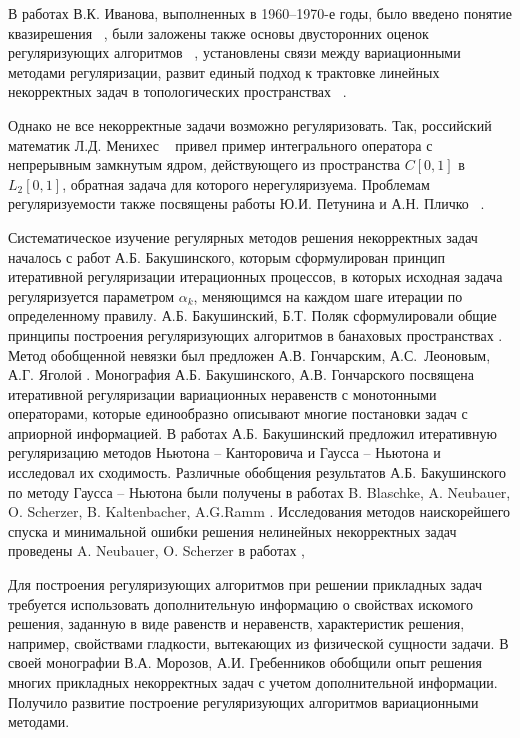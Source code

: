 {В работах В.К. Иванова, выполненных в 1960--1970-е годы, было введено понятие квазирешения ~\cite{Iv1962_2, Iv1963}, были заложены также основы двусторонних оценок регуляризующих алгоритмов ~\cite{Iv1966}, установлены связи между вариационными методами регуляризации, развит единый подход к трактовке линейных некорректных задач в топологических пространствах ~\cite{Iv1967}. 

Однако не все некорректные задачи возможно регуляризовать. Так, российский математик Л.Д. Менихес ~\cite{Menih1978} привел пример интегрального оператора с непрерывным замкнутым ядром, действующего из пространства \( C[0,1] \) в \( L_2[0,1] \), обратная задача для которого нерегуляризуема. Проблемам регуляризуемости также посвящены работы Ю.И. Петунина и А.Н. Пличко ~\cite{PetPlich1980}.

Систематическое изучение регулярных методов решения некорректных задач началось с работ А.Б. Бакушинского, которым сформулирован принцип итеративной регуляризации итерационных процессов, в которых исходная задача регуляризуется параметром $\alpha_k$, меняющимся на каждом шаге итерации по определенному правилу. А.Б. Бакушинский, Б.Т. Поляк сформулировали общие принципы построения регуляризующих алгоритмов в банаховых пространствах \cite{BakPol1974}. Метод обобщенной невязки был предложен А.В. Гончарским, А.С.~Леоновым, А.Г. Яголой \cite{GonLeoYag1973}. Монография А.Б. Бакушинского, А.В. Гончарского \cite{BakGon1989} посвящена итеративной регуляризации вариационных неравенств с монотонными операторами, которые единообразно описывают многие постановки задач с априорной информацией. В работах \cite{Bak1976,Bak1992} А.Б. Бакушинский предложил итеративную регуляризацию методов Ньютона -- Канторовича и Гаусса -- Ньютона и исследовал их сходимость. Различные обобщения результатов А.Б. Бакушинского по методу Гаусса -- Ньютона были получены в работах B. Blaschke, A. Neubauer, O. Scherzer, B. Kaltenbacher, A.G.Ramm \cite{BlaNeuSch1997,KalNeuRam2002}. Исследования методов наискорейшего спуска и минимальной ошибки решения нелинейных некорректных задач проведены A. Neubauer, O. Scherzer в работах  \cite{NeuSch1995_1,NeuSch1995_2,Sch1995},

Для построения регуляризующих алгоритмов при решении прикладных задач требуется использовать дополнительную информацию о свойствах искомого решения, заданную в виде равенств и неравенств, характеристик решения, например, свойствами гладкости, вытекающих из физической сущности задачи. В своей монографии \cite{MorGre1992} В.А. Морозов, А.И. Гребенников обобщили опыт решения многих прикладных  некорректных задач с учетом дополнительной информации. Получило развитие построение регуляризующих алгоритмов вариационными методами. 

}
